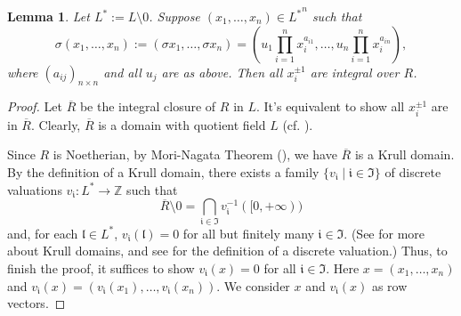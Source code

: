 \documentclass[12pt]{amsart}
\theoremstyle{plain}
\newtheorem{lemma}[theorem]{Lemma}
\theoremstyle{definition}
\theoremstyle{question}
\theoremstyle{remark}
\theoremstyle{assumption}
\numberwithin{equation}{section}
\theoremstyle{bigthm}
\begin{document}
\begin{lemma}\label{lem_integrity}
Let $L^{*} := L \setminus 0$. Suppose $(x_{1}, \dots, x_{n}) \in {L^{*}}^{n}$ such that
\begin{equation}\label{lem_integrity_1}
\sigma (x_{1}, \dots, x_{n}) := (\sigma x_{1}, \dots, \sigma x_{n}) = \left( u_{1} \prod_{i=1}^{n} x_{i}^{a_{i1}}, \dots, u_{n} \prod_{i=1}^{n} x_{i}^{a_{in}} \right),
\end{equation}
where $(a_{ij})_{n \times n}$ and all $u_{j}$ are as above. Then all $x_{i}^{\pm 1}$ are integral over $R$.
\end{lemma}
\begin{proof}
Let $\overline{R}$ be the integral closure of $R$ in $L$. It's equivalent to show all $x_{i}^{\pm 1}$ are in $\overline{R}$. Clearly, $\overline{R}$ is a domain with quotient field $L$ (cf. \cite[Corollary~5.3~\&~Proposition~5.12]{Atiyah_Macdonald}).

Since $R$ is Noetherian, by Mori-Nagata Theorem (\cite[Proposition~6]{Nishimura}), we have $\overline{R}$ is a Krull domain. By the definition of a Krull domain, there exists a family $\{ v_{\mathfrak{i}} \mid \mathfrak{i} \in \mathfrak{I} \}$ of discrete valuations $v_{\mathfrak{i}} \colon  L^{*} \rightarrow \mathbb{Z}$ such that
\begin{equation}\label{lem_integrity_2}
\overline{R} \setminus 0 = \bigcap_{\mathfrak{i} \in \mathfrak{I}} v_{\mathfrak{i}}^{-1} ([0, +\infty))
\end{equation}
and, for each $\mathfrak{l} \in L^{*}$, $v_{\mathfrak{i}} (\mathfrak{l}) = 0$ for all but finitely many $\mathfrak{i} \in \mathfrak{I}$. (See \cite[\S~12]{Matsumura2} for more about Krull domains, and see \cite[p.~94]{Atiyah_Macdonald} for the definition of a discrete valuation.) Thus, to finish the proof, it suffices to show $v_{\mathfrak{i}} (x) =0$ for all $\mathfrak{i} \in \mathfrak{I}$. Here $x=(x_{1}, \dots, x_{n})$ and $v_{\mathfrak{i}} (x) = (v_{\mathfrak{i}} (x_{1}), \dots, v_{\mathfrak{i}} (x_{n}))$. We consider $x$ and $v_{\mathfrak{i}} (x)$ as row vectors.


\end{proof}
\end{document}
